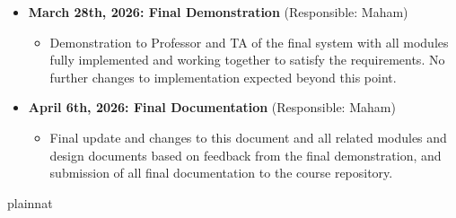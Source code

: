 \documentclass[12pt, titlepage]{article}
\begin{document}
\begin{itemize}
    \item \textbf{March 28th, 2026: Final Demonstration} (Responsible: Maham)
    \begin{itemize}
        \item Demonstration to Professor and TA of the final system with all modules fully implemented and working together to satisfy the requirements. No further changes to implementation expected beyond this point.
    \end{itemize}

    \item \textbf{April 6th, 2026: Final Documentation} (Responsible: Maham)
    \begin{itemize}
        \item Final update and changes to this document and all related modules and design documents based on feedback from the final demonstration, and submission of all final documentation to the course repository.
    \end{itemize}
\end{itemize}



 {plainnat}


\newpage{}
\end{document}
